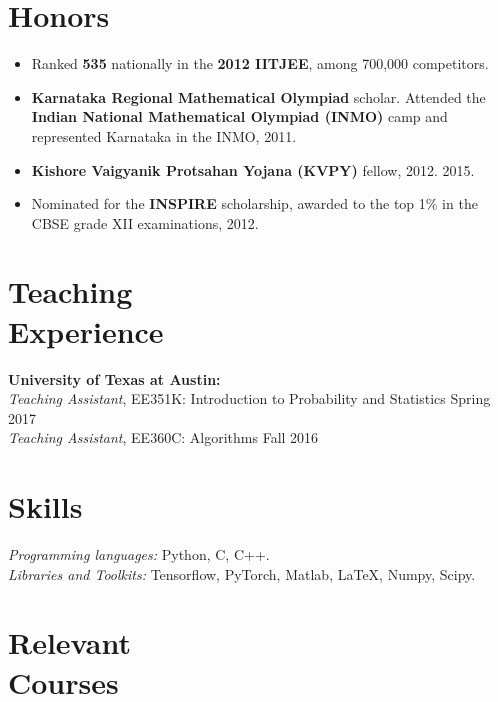 \documentclass[margin, 11pt]{res} %
\begin{document}
\begin{resume}

\section{\large Honors}
\begin{itemize}\itemsep -2pt
	\item Ranked {\bf 535} nationally in the {\bf 2012 IITJEE}, among 700,000 competitors.
	\item {\bf Karnataka Regional Mathematical Olympiad} scholar. Attended the {\bf Indian National Mathematical Olympiad (INMO)} camp and represented Karnataka
	in the INMO, 2011.
	\item {\bf Kishore Vaigyanik Protsahan Yojana (KVPY)} fellow, 2012.
	2015.
	\item Nominated for the {\bf INSPIRE} scholarship, awarded to the top 1\% in the CBSE grade XII
	examinations, 2012.
\end{itemize}

\section{\large Teaching \\ Experience}
{\bf University of Texas at Austin:}\\
{\sl Teaching Assistant}, EE351K: Introduction to Probability and Statistics \hfill Spring 2017\\
{\sl Teaching Assistant}, EE360C: Algorithms \hfill Fall 2016

\section{\large Skills}
{\sl Programming languages:} Python, C, C++.\\
{\sl Libraries and Toolkits:} Tensorflow, PyTorch, Matlab, \LaTeX, Numpy, Scipy.

\section{\large Relevant \\ Courses}


\end{resume}
\end{document}
